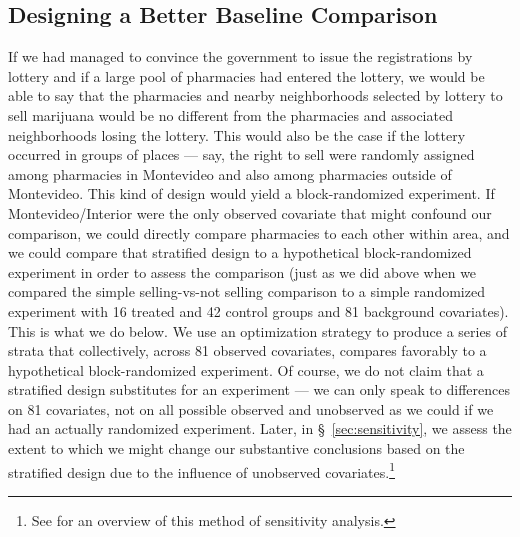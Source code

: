 \documentclass[11pt]{article}
\begin{document}


\subsection{Designing a Better Baseline Comparison}
If we had managed to convince the government to issue the registrations by lottery and if a large pool of pharmacies had entered the lottery, we would be able to say that the pharmacies and nearby neighborhoods selected by lottery to sell marijuana would be no different from the pharmacies and associated neighborhoods losing the lottery. This would also be the case if the lottery occurred in groups of places --- say, the right to sell were randomly assigned among pharmacies in Montevideo and also among pharmacies outside of Montevideo. This kind of design would yield a block-randomized experiment. If Montevideo/Interior were the only observed covariate that might confound our comparison, we could directly compare pharmacies to each other within area, and we could compare that stratified design to a hypothetical block-randomized experiment in order to assess the comparison (just as we did above when we compared the simple selling-vs-not selling comparison to a simple randomized experiment with 16 treated and 42 control groups and 81 background covariates). This is what we do below. We use an optimization strategy to produce a series of strata that collectively, across 81 observed covariates, compares favorably to a hypothetical block-randomized experiment. Of course, we do not claim that a stratified design substitutes for an experiment --- we can only speak to differences on 81 covariates, not on all possible observed and unobserved as we could if we had an actually randomized experiment. Later, in \S~\ref{sec:sensitivity}, we assess the extent to which we might change our substantive conclusions based on the stratified design due to the influence of unobserved covariates.\footnote{See \citep[Chapter 3]{rosenbaum2010design} for an overview of this method of sensitivity analysis.}
\end{document}
